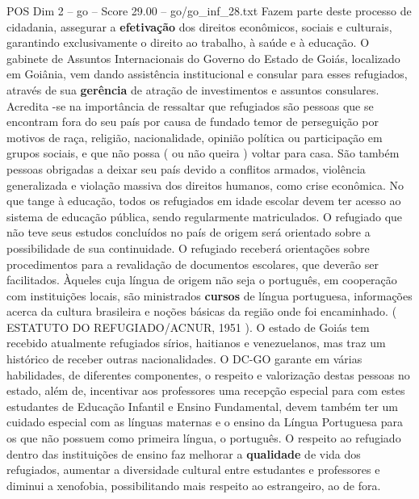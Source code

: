 \begin{textsample}{POS Dim 2 – go – Score 29.00 – go/go\_inf\_28.txt}
Fazem parte deste processo de cidadania, assegurar a \textbf{efetivação} dos direitos econômicos, sociais e culturais, garantindo exclusivamente o direito ao trabalho, à saúde e à educação.
O gabinete de Assuntos Internacionais do Governo do Estado de Goiás, localizado em Goiânia, vem dando assistência institucional e consular para esses refugiados, através de sua \textbf{gerência} de atração de investimentos e assuntos consulares.
Acredita -se na importância de ressaltar que refugiados são pessoas que se encontram fora do seu país por causa de fundado temor de perseguição por motivos de raça, religião, nacionalidade, opinião política ou participação em grupos sociais, e que não possa ( ou não queira ) voltar para casa.
São também pessoas obrigadas a deixar seu país devido a conflitos armados, violência generalizada e violação massiva dos direitos humanos, como crise econômica.
No que tange à educação, todos os refugiados em idade escolar devem ter acesso ao sistema de educação pública, sendo regularmente matriculados.
O refugiado que não teve seus estudos concluídos no país de origem será orientado sobre a possibilidade de sua continuidade.
O refugiado receberá orientações sobre procedimentos para a revalidação de documentos escolares, que deverão ser facilitados.
Àqueles cuja língua de origem não seja o português, em cooperação com instituições locais, são ministrados \textbf{cursos} de língua portuguesa, informações acerca da cultura brasileira e noções básicas da região onde foi encaminhado. ( ESTATUTO DO REFUGIADO/ACNUR, 1951 ).
O estado de Goiás tem recebido atualmente refugiados sírios, haitianos e venezuelanos, mas traz um histórico de receber outras nacionalidades.
O DC-GO garante em várias habilidades, de diferentes componentes, o respeito e valorização destas pessoas no estado, além de, incentivar aos professores uma recepção especial para com estes estudantes de Educação Infantil e Ensino Fundamental, devem também ter um cuidado especial com as línguas maternas e o ensino da Língua Portuguesa para os que não possuem como primeira língua, o português.
O respeito ao refugiado dentro das instituições de ensino faz melhorar a \textbf{qualidade} de vida dos refugiados, aumentar a diversidade cultural entre estudantes e professores e diminui a xenofobia, possibilitando mais respeito ao estrangeiro, ao de fora.

\end{textsample}
